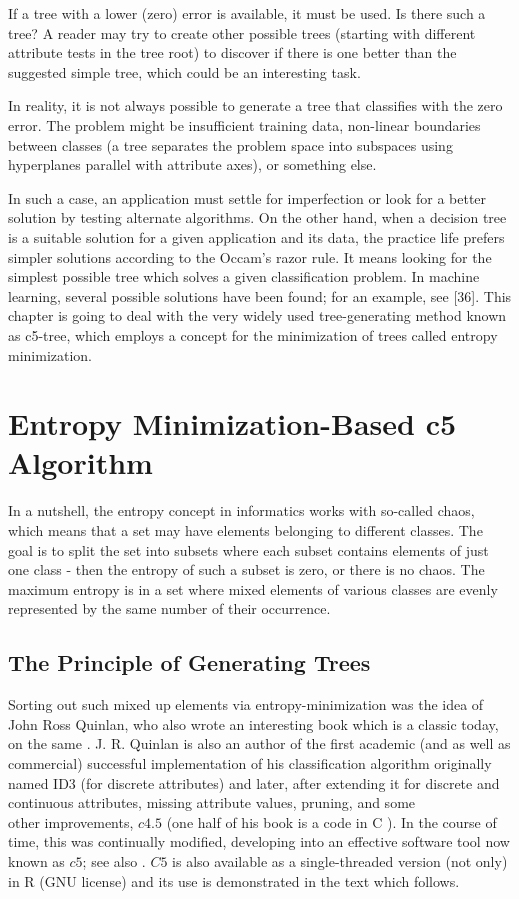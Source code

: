 If a tree with a lower (zero) error is available, it must be used. Is there such a tree? A reader may try to create other possible trees (starting with different attribute tests in the tree root) to discover if there is one better than the suggested simple tree, which could be an interesting task.

In reality, it is not always possible to generate a tree that classifies with the zero error. The problem might be insufficient training data, non-linear boundaries between classes (a tree separates the problem space into subspaces using hyperplanes parallel with attribute axes), or something else.

In such a case, an application must settle for imperfection or look for a better solution by testing alternate algorithms. On the other hand, when a decision tree is a suitable solution for a given application and its data, the practice life prefers simpler solutions according to the Occam's razor rule. It means looking for the simplest possible tree which solves a given classification problem. In machine learning, several possible solutions have been found; for an example, see [36]. This chapter is going to deal with the very widely used tree-generating method known as c5-tree, which employs a concept for the minimization of trees called entropy minimization.

\section{Entropy Minimization-Based \texorpdfstring{$\boldsymbol{c}\mathbf{5}$}{c5} Algorithm}

In a nutshell, the entropy concept in informatics works with so-called chaos, which means that a set may have elements belonging to different classes. The goal is to split the set into subsets where each subset contains elements of just one class - then the entropy of such a subset is zero, or there is no chaos. The maximum entropy is in a set where mixed elements of various classes are evenly represented by the same number of their occurrence.

\subsection{The Principle of Generating Trees}
Sorting out such mixed up elements via entropy-minimization was the idea of John Ross Quinlan, who also wrote an interesting book which is a classic today, on the same \cite{ref220}. J. R. Quinlan is also an author of the first academic (and as well as commercial) successful implementation of his classification algorithm originally named ID3 (for discrete attributes) and later, after extending it for discrete and continuous attributes, missing attribute values, pruning, and some\\
other improvements, $c 4.5$ (one half of his book is a code in C ). In the course of time, this was continually modified, developing into an effective software tool now known as $c 5$; see also \cite{ref224}. $C 5$ is also available as a single-threaded version (not only) in R (GNU license) and its use is demonstrated in the text which follows.

